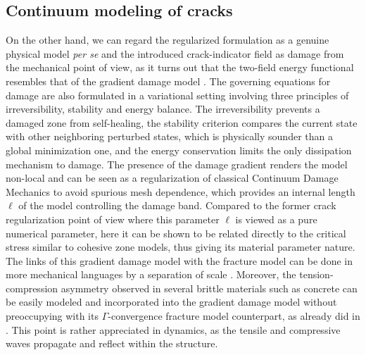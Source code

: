 \subsection{Continuum modeling of cracks}
On the other hand, we can regard the regularized formulation as a genuine physical model \emph{per se} and the introduced crack-indicator field as damage from the mechanical point of view, as it turns out that the two-field energy functional resembles that of the gradient damage model \cite{PhamMarigo:2010,PhamMarigo:2010-1,PhamAmorMarigoMaurini:2011,SicsicMarigoMaurini:2013}. The governing equations for damage are also formulated in a variational setting involving three principles of irreversibility, stability and energy balance. The irreversibility prevents a damaged zone from self-healing, the stability criterion compares the current state with other neighboring perturbed states, which is physically sounder than a global minimization one, and the energy conservation limits the only dissipation mechanism to damage. The presence of the damage gradient renders the model non-local and can be seen as a regularization of classical Continuum Damage Mechanics to avoid spurious mesh dependence, which provides an internal length $\ell$ of the model controlling the damage band. Compared to the former crack regularization point of view where this parameter $\ell$ is viewed as a pure numerical parameter, here it can be shown to be related directly to the critical stress similar to cohesive zone models, thus giving its material parameter nature. The links of this gradient damage model with the fracture model can be done in more mechanical languages by a separation of scale \cite{SicsicMarigo:2013,LorentzCuvilliezKazymyrenko:2011,LorentzCuvilliezKazymyrenko:2012}. Moreover, the tension-compression asymmetry observed in several brittle materials such as concrete can be easily modeled and incorporated into the gradient damage model without preoccupying with its $\Gamma$-convergence fracture model counterpart, as already did in \cite{AmorMarigoMaurini:2009,FreddiRoyer-Carfagni:2010,LancioniRoyer-Carfagni:2009}. This point is rather appreciated in dynamics, as the tensile and compressive waves propagate and reflect within the structure.


